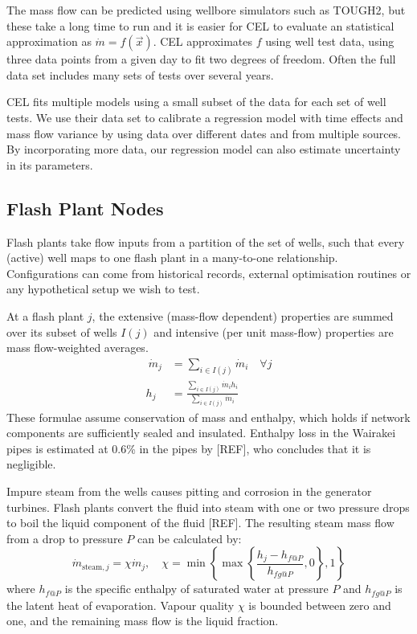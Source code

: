 \documentclass[a4paper, 12pt]{article}
\newlength{\drop}
\begin{document}
The mass flow can be predicted using wellbore simulators such as TOUGH2, but these take a long time to run and it is easier for CEL to evaluate an statistical approximation as $\dot{m} = f(\vec{x})$. CEL approximates $f$ using well test data, using three data points from a given day to fit two degrees of freedom. Often the full data set includes many sets of tests over several years.

CEL fits multiple models using a small subset of the data for each set of well tests. We use their data set to calibrate a regression model with time effects and mass flow variance by using data over different dates and from multiple sources. By incorporating more data, our regression model can also estimate uncertainty in its parameters.

\subsection{Flash Plant Nodes}
Flash plants take flow inputs from a partition of the set of wells, such that every (active) well maps to one flash plant in a many-to-one relationship. Configurations can come from historical records, external optimisation routines or any hypothetical setup we wish to test.

At a flash plant $j$, the extensive (mass-flow dependent) properties are summed over its subset of wells $I(j)$ and intensive (per unit mass-flow) properties are mass flow-weighted averages.
\begin{align} \
\dot{m}_j &= \sum_{i\in I(j)} \dot{m}_i\quad \forall j \label{eq:fp_mf} \\
h_j &= \frac{\sum_{i\in I(j)} \dot{m}_i h_i}{\sum_{i\in I(j)} \dot{m}_i} \label{eq:fp_h}
\end{align}
These formulae assume conservation of mass and enthalpy, which holds if network components are sufficiently sealed and insulated. Enthalpy loss in the Wairakei pipes is estimated at 0.6\% in the pipes by [REF], who concludes that it is negligible.

Impure steam from the wells causes pitting and corrosion in the generator turbines. Flash plants convert the fluid into steam with one or two pressure drops to boil the liquid component of the fluid [REF]. The resulting steam mass flow from a drop to pressure $P$ can be calculated by:
\begin{equation}
\dot{m}_{\text{steam},j} = \chi\dot{m}_j,\quad \chi= \min{\left\{\max{\left\{\frac{h_j - h_{f@P}}{h_{fg@P}}, 0\right\}}, 1\right\}}
\end{equation}
where $h_{f@P}$ is the specific enthalpy of saturated water at pressure $P$ and $h_{fg@P}$ is the latent heat of evaporation. Vapour quality $\chi$ is bounded between zero and one, and the remaining mass flow is the liquid fraction.
\end{document}

